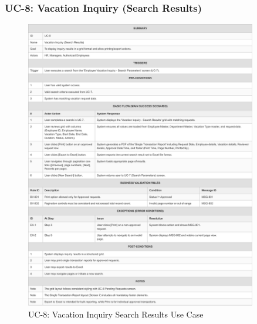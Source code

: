 \documentclass[12pt,a4paper]{article}
\begin{document}
\subsubsection{UC-8: Vacation Inquiry (Search Results)}
\begin{figure}[H]
\centering
\includegraphics[width=0.9\textwidth]{Use-Cases/UC-8-Vacation-Inquiry-Search-Results/UC-8-Vacation-Inquiry-Search-Results-1.png}
\caption{UC-8: Vacation Inquiry Search Results Use Case}
\label{fig:uc8}
\end{figure}
\end{document}
